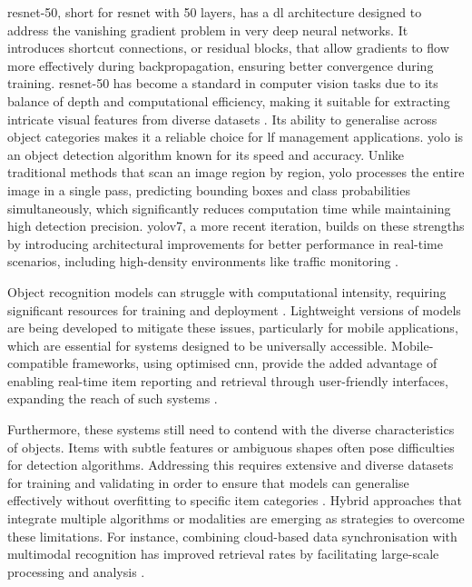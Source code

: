 \ac{resnet}-50, short for \acl{resnet} with 50 layers, has a \ac{dl} architecture designed to address the vanishing gradient problem in very deep neural networks. It introduces shortcut connections, or residual blocks, that allow gradients to flow more effectively during backpropagation, ensuring better convergence during training. \ac{resnet}-50 has become a standard in computer vision tasks due to its balance of depth and computational efficiency, making it suitable for extracting intricate visual features from diverse datasets \cite{He2015}. Its ability to generalise across object categories makes it a reliable choice for \ac{lf} management applications. \ac{yolo} is an object detection algorithm known for its speed and accuracy. Unlike traditional methods that scan an image region by region, \ac{yolo} processes the entire image in a single pass, predicting bounding boxes and class probabilities simultaneously, which significantly reduces computation time while maintaining high detection precision. \ac{yolo}v7, a more recent iteration, builds on these strengths by introducing architectural improvements for better performance in real-time scenarios, including high-density environments like traffic monitoring \cites{Redmon2015, Wang2022}.

Object recognition models can struggle with computational intensity, requiring significant resources for training and deployment \cites{Lubna2021, Mezhenin2021}. Lightweight versions of models are being developed to mitigate these issues, particularly for mobile applications, which are essential for systems designed to be universally accessible. Mobile-compatible frameworks, using optimised \ac{cnn}, provide the added advantage of enabling real-time item reporting and retrieval through user-friendly interfaces, expanding the reach of such systems \cites{Stout2024, Ghazal2016}.

Furthermore, these systems still need to contend with the diverse characteristics of objects. Items with subtle features or ambiguous shapes often pose difficulties for detection algorithms. Addressing this requires extensive and diverse datasets for training and validating in order to ensure that models can generalise effectively without overfitting to specific item categories \cites{Prawira2024, Liu2022, Sharma2024}. Hybrid approaches that integrate multiple algorithms or modalities are emerging as strategies to overcome these limitations. For instance, combining cloud-based data synchronisation with multimodal recognition has improved retrieval rates by facilitating large-scale processing and analysis \cite{Liu2024, Vedanth2024}.

